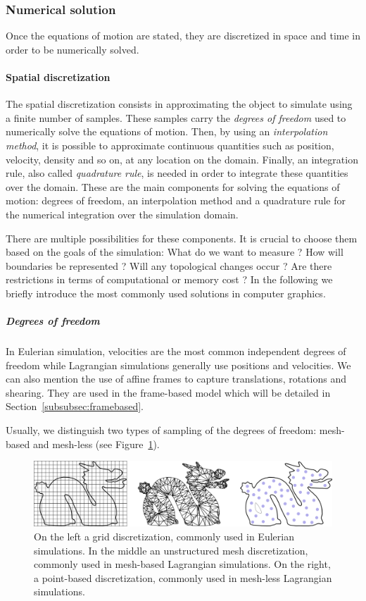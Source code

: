 \subsubsection{Numerical solution}
\label{subsubsec:starMechanics_numericalSolution}
Once the equations of motion are stated, they are discretized in space and time in order to be numerically solved.

\paragraph{Spatial discretization}
The spatial discretization consists in approximating the object to simulate using a finite number of samples. 
These samples carry the \emph{degrees of freedom} used to numerically solve the equations of motion.
Then, by using an \emph{interpolation method}, it is possible to approximate continuous quantities such as position, velocity, density and so on, at any location on the domain. 
Finally, an integration rule, also called \emph{quadrature rule}, is needed in order to integrate these quantities over the domain. 
These are the main components for solving the equations of motion:
degrees of freedom, an interpolation method and a quadrature rule for the numerical integration over the simulation domain.

There are multiple possibilities for these components. It is crucial to choose them based on the goals of the simulation: What do we want to measure ? How will boundaries be represented ? Will any topological changes occur ? Are there restrictions in terms of computational or memory cost ? In the following we briefly introduce the most commonly used solutions in computer graphics.

\subparagraph{Degrees of freedom}
In Eulerian simulation, velocities are the most common independent degrees of freedom while Lagrangian simulations generally use positions and velocities. 
We can also mention the use of affine frames to capture translations, rotations and shearing. They are used in the frame-based model which will be detailed in Section~\ref{subsubsec:framebased}.

Usually, we distinguish two types of sampling of the degrees of freedom: mesh-based and mesh-less (see Figure~\ref{fig:discretization}).
\begin{figure}[!h]
	\centering
	\includegraphics[width=\linewidth]{images/continuum_mechanics/discretization.png}
	\caption[STAR mechanics: Discretization]{\label{fig:discretization} On the left a grid discretization, commonly used in Eulerian simulations. In the middle an unstructured mesh discretization, commonly used in mesh-based Lagrangian simulations. On the right, a point-based discretization, commonly used in mesh-less Lagrangian simulations.}
\end{figure}

